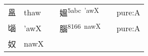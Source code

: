 \documentclass[14pt,a4paper]{scrartcl}
\begin{document}
\begin{longtable}[c]{@{}llllll@{}}
\begin{minipage}[t]{0.14\columnwidth}\raggedright\strut
𥁕
\strut\end{minipage} &
\begin{minipage}[t]{0.14\columnwidth}\raggedright\strut
thaw
\strut\end{minipage} &
\begin{minipage}[t]{0.14\columnwidth}\raggedright\strut
\strut\end{minipage} &
\begin{minipage}[t]{0.14\columnwidth}\raggedright\strut
媼\textsuperscript{5abc~'awX}
\strut\end{minipage} &
\begin{minipage}[t]{0.14\columnwidth}\raggedright\strut
\strut\end{minipage} &
\begin{minipage}[t]{0.14\columnwidth}\raggedright\strut
pure:A
\strut\end{minipage}\tabularnewline
\begin{minipage}[t]{0.14\columnwidth}\raggedright\strut
匘
\strut\end{minipage} &
\begin{minipage}[t]{0.14\columnwidth}\raggedright\strut
'awX
\strut\end{minipage} &
\begin{minipage}[t]{0.14\columnwidth}\raggedright\strut
\strut\end{minipage} &
\begin{minipage}[t]{0.14\columnwidth}\raggedright\strut
腦\textsuperscript{8166~nawX}
\strut\end{minipage} &
\begin{minipage}[t]{0.14\columnwidth}\raggedright\strut
\strut\end{minipage} &
\begin{minipage}[t]{0.14\columnwidth}\raggedright\strut
pure:A
\strut\end{minipage}\tabularnewline
\begin{minipage}[t]{0.14\columnwidth}\raggedright\strut
奴
\strut\end{minipage} &
\begin{minipage}[t]{0.14\columnwidth}\raggedright\strut
nawX
\strut\end{minipage} &
\begin{minipage}[t]{0.14\columnwidth}\raggedright\strut
\strut\end{minipage} &
\begin{minipage}[t]{0.14\columnwidth}\raggedright\strut

\end{minipage}
\end{longtable}
\end{document}

